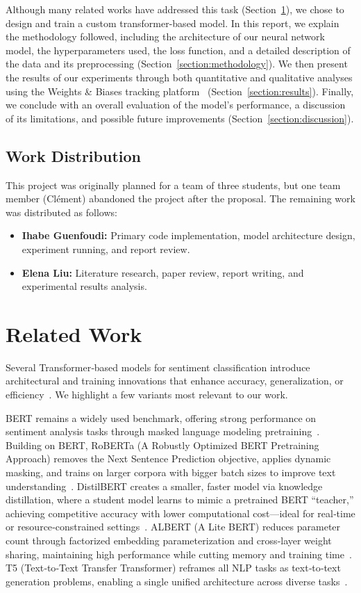 \documentclass[twocolumn,superscriptaddress,aps]{revtex4-1}
\begin{document}
Although many related works have addressed this task (Section~\ref{section:related_work}), we chose to design and train a custom transformer-based model.
In this report, we explain the methodology followed, including the architecture of our neural network model, the hyperparameters used, the loss function, and a detailed description of the data and its preprocessing (Section~\ref{section:methodology}). We then present the results of our experiments through both quantitative and qualitative analyses using the Weights \& Biases tracking platform~\cite{wandb} (Section~\ref{section:results}). Finally, we conclude with an overall evaluation of the model's performance, a discussion of its limitations, and possible future improvements (Section~\ref{section:discussion}).

\subsection{Work Distribution}
This project was originally planned for a team of three students, but one team member (Clément) abandoned the project after the proposal. The remaining work was distributed as follows:
\begin{itemize}
  \item \textbf{Ihabe Guenfoudi:} Primary code implementation, model architecture design, experiment running, and report review.
  \item \textbf{Elena Liu:} Literature research, paper review, report writing, and experimental results analysis.
\end{itemize}

\section{Related Work}
\label{section:related_work}

Several Transformer‐based models for sentiment classification introduce architectural and training innovations that enhance accuracy, generalization, or efficiency~\cite{bashiri2024comprehensive}. We highlight a few variants most relevant to our work.

BERT remains a widely used benchmark, offering strong performance on sentiment analysis tasks through masked language modeling pretraining~\cite{aftan2023bert}. Building on BERT, RoBERTa (A Robustly Optimized BERT Pretraining Approach) removes the Next Sentence Prediction objective, applies dynamic masking, and trains on larger corpora with bigger batch sizes to improve text understanding~\cite{roberta2019}. DistilBERT creates a smaller, faster model via knowledge distillation, where a student model learns to mimic a pretrained BERT “teacher,” achieving competitive accuracy with lower computational cost—ideal for real‐time or resource‐constrained settings~\cite{distilbert}. ALBERT (A Lite BERT) reduces parameter count through factorized embedding parameterization and cross‐layer weight sharing, maintaining high performance while cutting memory and training time~\cite{lan2019albert}. T5 (Text‐to‐Text Transfer Transformer) reframes all NLP tasks as text‐to‐text generation problems, enabling a single unified architecture across diverse tasks~\cite{T5}. 
\end{document}

